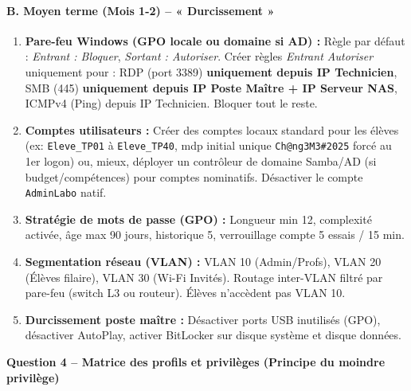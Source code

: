 \documentclass[11pt]{article}
\begin{document}
\begin{exoresolu}
\paragraph{B. Moyen terme (Mois 1-2) -- « Durcissement »}
\begin{enumerate}
    \item \textbf{Pare-feu Windows (GPO locale ou domaine si AD) :} Règle par défaut : \emph{Entrant : Bloquer}, \emph{Sortant : Autoriser}. Créer règles \emph{Entrant Autoriser} uniquement pour : RDP (port 3389) \textbf{uniquement depuis IP Technicien}, SMB (445) \textbf{uniquement depuis IP Poste Maître + IP Serveur NAS}, ICMPv4 (Ping) depuis IP Technicien. Bloquer tout le reste.
    \item \textbf{Comptes utilisateurs :} Créer des comptes locaux standard pour les élèves (ex: \texttt{Eleve\_TP01} à \texttt{Eleve\_TP40}, mdp initial unique \texttt{Ch@ng3M3\#2025} forcé au 1er logon) ou, mieux, déployer un contrôleur de domaine Samba/AD (si budget/compétences) pour comptes nominatifs. Désactiver le compte \texttt{AdminLabo} natif.
    \item \textbf{Stratégie de mots de passe (GPO) :} Longueur min 12, complexité activée, âge max 90 jours, historique 5, verrouillage compte 5 essais / 15 min.
    \item \textbf{Segmentation réseau (VLAN) :} VLAN 10 (Admin/Profs), VLAN 20 (Élèves filaire), VLAN 30 (Wi-Fi Invités). Routage inter-VLAN filtré par pare-feu (switch L3 ou routeur). Élèves n'accèdent pas VLAN 10.
    \item \textbf{Durcissement poste maître :} Désactiver ports USB inutilisés (GPO), désactiver AutoPlay, activer BitLocker sur disque système et disque données.
\end{enumerate}

\textbf{Question 4 -- Matrice des profils et privilèges (Principe du moindre privilège)}


\end{exoresolu}
\end{document}
